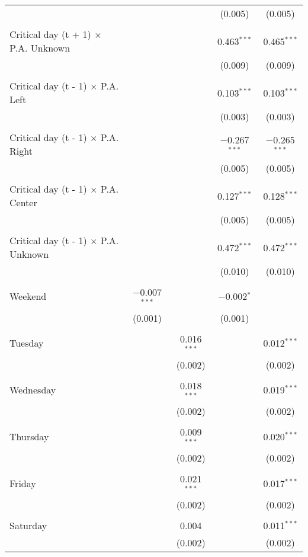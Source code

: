 \documentclass[
]{article}
\begin{document}
\begin{table}[!htbp]
{\begin{tabular}{@{\extracolsep{5pt}}lcccc}
  &  &  & (0.005) & (0.005) \\ 
  & & & & \\ 
 Critical day (t + 1) $\times$ P.A. Unknown &  &  & 0.463$^{***}$ & 0.465$^{***}$ \\ 
  &  &  & (0.009) & (0.009) \\ 
  & & & & \\ 
 Critical day (t - 1) $\times$ P.A. Left &  &  & 0.103$^{***}$ & 0.103$^{***}$ \\ 
  &  &  & (0.003) & (0.003) \\ 
  & & & & \\ 
 Critical day (t - 1) $\times$ P.A. Right &  &  & $-$0.267$^{***}$ & $-$0.265$^{***}$ \\ 
  &  &  & (0.005) & (0.005) \\ 
  & & & & \\ 
 Critical day (t - 1) $\times$ P.A. Center &  &  & 0.127$^{***}$ & 0.128$^{***}$ \\ 
  &  &  & (0.005) & (0.005) \\ 
  & & & & \\ 
 Critical day (t - 1) $\times$ P.A. Unknown &  &  & 0.472$^{***}$ & 0.472$^{***}$ \\ 
  &  &  & (0.010) & (0.010) \\ 
  & & & & \\ 
 Weekend & $-$0.007$^{***}$ &  & $-$0.002$^{*}$ &  \\ 
  & (0.001) &  & (0.001) &  \\ 
  & & & & \\ 
 Tuesday &  & 0.016$^{***}$ &  & 0.012$^{***}$ \\ 
  &  & (0.002) &  & (0.002) \\ 
  & & & & \\ 
 Wednesday &  & 0.018$^{***}$ &  & 0.019$^{***}$ \\ 
  &  & (0.002) &  & (0.002) \\ 
  & & & & \\ 
 Thursday &  & 0.009$^{***}$ &  & 0.020$^{***}$ \\ 
  &  & (0.002) &  & (0.002) \\ 
  & & & & \\ 
 Friday &  & 0.021$^{***}$ &  & 0.017$^{***}$ \\ 
  &  & (0.002) &  & (0.002) \\ 
  & & & & \\ 
 Saturday &  & 0.004 &  & 0.011$^{***}$ \\ 
  &  & (0.002) &  & (0.002) \\ 

\end{tabular}}
\end{table}
\end{document}
